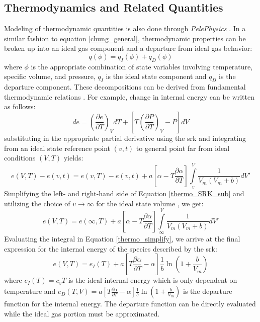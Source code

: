 \subsection{Thermodynamics and Related Quantities}
Modeling of thermodynamic quantities is also done through \textit{PelePhysics} \cite{}. In a similar fashion to equation \ref{chung_general}, thermodynamic properties can be broken up into an ideal gas component and a departure from ideal gas behavior:
\begin{equation} \label{thermo_general}
q(\phi) = q_{I}(\phi) + q_{D}(\phi)
\end{equation}
where $\phi$ is the appropriate combination of state variables involving temperature, specific volume, and pressure, $q_{I}$ is the ideal state component and $q_{D}$ is the departure component. These decompositions can be derived from fundamental thermodynamic relations \cite{}. For example, change in internal energy can be written as follows:
\begin{equation} \label{thermo_example}
de = \left( \dfrac{\partial e}{\partial T} \right)_{V} dT + \left[ T \left( \dfrac{\partial P}{\partial T} \right)_{V} - P  \right] dV
\end{equation}
substituting in the appropriate partial derivative using the \gls{srk} and integrating from an ideal state reference point $(v,t)$ to general point far from ideal conditions $(V,T)$ yields:
\begin{equation}  \label{thermo_SRK_sub}
e(V,T) - e(v,t) =  e(v,T) - e(v,t) + a \left[ \alpha - T \dfrac{\partial \alpha}{\partial T} \right] \int\limits_{v}^{V} \dfrac{1}{V_m(V_m + b)}dV'
\end{equation}
Simplifying the left- and right-hand side of Equation \ref{thermo_SRK_sub} and utilizing the choice of $v \to \infty$ for the ideal state volume \cite{}, we get:
\begin{equation} \label{thermo_simplify}
e(V,T) =  e(\infty,T) + a \left[ \alpha - T \dfrac{\partial \alpha}{\partial T} \right] \int\limits_{\infty}^{V} \dfrac{1}{V_m(V_m + b)}dV'
\end{equation}
Evaluating the integral in Equation \ref{thermo_simplify}, we arrive at the final expression for the internal energy of the species described by the \gls{srk}: 
\begin{equation} \label{thermo_final}
e(V,T) =  e_I(T) + a \left[ T \dfrac{\partial \alpha}{\partial T} - \alpha \right] \dfrac{1}{b}\ln\left( 1 + \dfrac{b}{V_m} \right)
\end{equation}
where $e_I(T)=c_vT$ is the ideal internal energy which is only dependent on temperature and $e_D(T,V) = a \left[ T \tfrac{\partial \alpha}{\partial T} - \alpha \right] \tfrac{1}{b}\ln\left( 1 + \tfrac{b}{V_m} \right)$ is the departure function for the internal energy. The departure function can be directly evaluated while the ideal gas portion must be approximated. 

